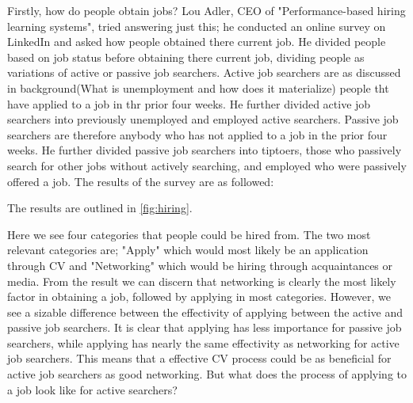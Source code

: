Firstly, how do people obtain jobs?
Lou Adler, CEO of "Performance-based hiring learning systems", tried answering just this; he conducted an online survey on LinkedIn and asked how people obtained there current job.
He divided people based on job status before obtaining there current job, dividing people as variations of active or passive job searchers.
Active job searchers are as discussed in background(What is unemployment and how does it materialize) people tht have applied to a job in thr prior four weeks.
He further divided active job searchers into previously unemployed and employed active searchers.
Passive job searchers are therefore anybody who has not applied to a job in the prior four weeks.
He further divided passive job searchers into tiptoers, those who passively search for other jobs without actively searching, and employed who were passively offered a job.
The results of the survey are as followed: 

The results are outlined in \vref{fig:hiring}.

Here we see four categories that people could be hired from.
The two most relevant categories are; "Apply" which would most likely be an application through CV and "Networking" which would be hiring through acquaintances or media.
From the result we can discern that networking is clearly the most likely factor in obtaining a job, followed by applying in most categories.
However, we see a sizable difference between the effectivity of applying between the active and passive job searchers. 
It is clear that applying has less importance for passive job searchers, while applying has nearly the same effectivity as networking for active job searchers. 
This means that a effective CV process could be as beneficial for active job searchers as good networking.
But what does the process of applying to a job look like for active searchers?

